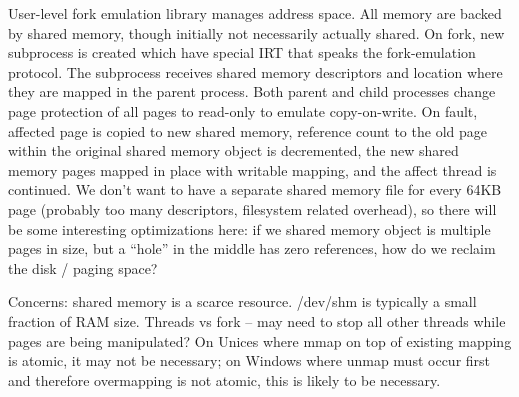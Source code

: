 User-level fork emulation library manages address space.  All memory
are backed by shared memory, though initially not necessarily actually
shared.  On fork, new subprocess is created which have special IRT
that speaks the fork-emulation protocol.  The subprocess receives
shared memory descriptors and location where they are mapped in the
parent process.  Both parent and child processes change page
protection of all pages to read-only to emulate copy-on-write.  On
fault, affected page is copied to new shared memory, reference count
to the old page within the original shared memory object is
decremented, the new shared memory pages mapped in place with writable
mapping, and the affect thread is continued.  We don't want to have a
separate shared memory file for every 64KB page (probably too many
descriptors, filesystem related overhead), so there will be some
interesting optimizations here: if we shared memory object is multiple
pages in size, but a ``hole'' in the middle has zero references, how
do we reclaim the disk / paging space?

Concerns: shared memory is a scarce resource.  /dev/shm is typically a
small fraction of RAM size.  Threads vs fork -- may need to stop all
other threads while pages are being manipulated?  On Unices where mmap
on top of existing mapping is atomic, it may not be necessary; on
Windows where unmap must occur first and therefore overmapping is not
atomic, this is likely to be necessary.
